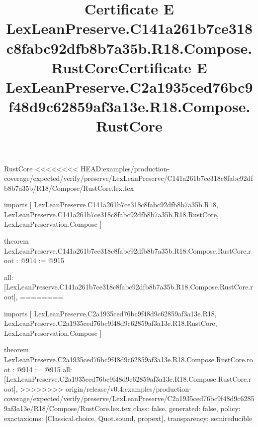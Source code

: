 \begin{lexlean}{RustCore}
<<<<<<<< HEAD:examples/production-coverage/expected/verify/preserve/LexLeanPreserve/C141a261b7ce318c8fabc92dfb8b7a35b/R18/Compose/RustCore.lex.tex
\title{Certificate E LexLeanPreserve.C141a261b7ce318c8fabc92dfb8b7a35b.R18.Compose.RustCore}
\begin{coremodule}
imports [
  LexLeanPreserve.C141a261b7ce318c8fabc92dfb8b7a35b.R18,
  LexLeanPreserve.C141a261b7ce318c8fabc92dfb8b7a35b.R18.RustCore,
  LexLeanPreservation.Compose
]

theorem LexLeanPreserve.C141a261b7ce318c8fabc92dfb8b7a35b.R18.Compose.RustCore.root : @914 := @915 {
  all: [LexLeanPreserve.C141a261b7ce318c8fabc92dfb8b7a35b.R18.Compose.RustCore.root],
========
\title{Certificate E LexLeanPreserve.C2a1935ced76bc9f48d9c62859af3a13e.R18.Compose.RustCore}
\begin{coremodule}
imports [
  LexLeanPreserve.C2a1935ced76bc9f48d9c62859af3a13e.R18,
  LexLeanPreserve.C2a1935ced76bc9f48d9c62859af3a13e.R18.RustCore,
  LexLeanPreservation.Compose
]

theorem LexLeanPreserve.C2a1935ced76bc9f48d9c62859af3a13e.R18.Compose.RustCore.root : @914 := @915 {
  all: [LexLeanPreserve.C2a1935ced76bc9f48d9c62859af3a13e.R18.Compose.RustCore.root],
>>>>>>>> origin/release/v0.4:examples/production-coverage/expected/verify/preserve/LexLeanPreserve/C2a1935ced76bc9f48d9c62859af3a13e/R18/Compose/RustCore.lex.tex
  class: false,
  generated: false,
  policy: exact{axioms: [Classical.choice, Quot.sound, propext]},
  transparency: semireducible
}


\end{coremodule}}
\end{coremodule}
\end{lexlean}
